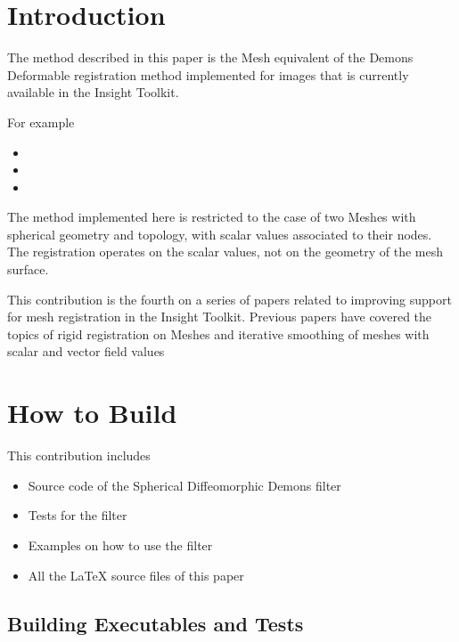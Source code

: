 \documentclass{InsightArticle}
\begin{document}
\tableofcontents

\section{Introduction}

The method described in this paper is the Mesh equivalent of the Demons
Deformable registration method implemented for images that is currently
available in the Insight Toolkit.

For example

\begin{itemize}
\item {}
\item {}
\item {}
\end{itemize}

The method implemented here is restricted to the case of two Meshes with
spherical geometry and topology, with scalar values associated to their nodes.
The registration operates on the scalar values, not on the geometry of the mesh
surface.

This contribution is the fourth on a series of papers related to improving
support for mesh registration in the Insight Toolkit. Previous papers have
covered the topics of rigid registration on Meshes and iterative smoothing of
meshes with scalar and vector field
values~\cite{MeshSmoothingIJ2009,MeshRigidRegistrationIJ2009} 

\section{How to Build}

This contribution includes

\begin{itemize}
\item Source code of the Spherical Diffeomorphic Demons filter
\item Tests for the filter
\item Examples on how to use the filter
\item All the LaTeX source files of this paper
\end{itemize}

\subsection{Building Executables and Tests}
\end{document}
